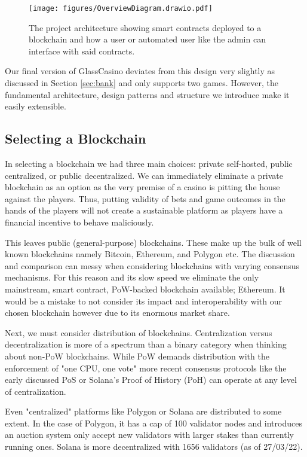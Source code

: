 \documentclass[10pt,journal,compsoc]{IEEEtran}
\begin{document}
\begin{figure}[!h]
    \centering
    \texttt{[image: figures/OverviewDiagram.drawio.pdf]}
    \caption{The project architecture showing smart contracts deployed to a blockchain and how a user or automated user like the admin can interface with said contracts.}
    \label{fig:overallarch}
\end{figure}

Our final version of GlassCasino deviates from this design very slightly as discussed in Section \ref{sec:bank} and only supports two games. However, the fundamental architecture, design patterns and structure we introduce make it easily extensible.

\subsection{Selecting a Blockchain}
In selecting a blockchain we had three main choices: private self-hosted, public centralized, or public decentralized. We can immediately eliminate a private blockchain as an option as the very premise of a casino is pitting the house against the players. Thus, putting validity of bets and game outcomes in the hands of the players will not create a sustainable platform as players have a financial incentive to behave maliciously.

This leaves public (general-purpose) blockchains. These make up the bulk of well known blockchains namely Bitcoin, Ethereum, and Polygon etc. The discussion and comparison can messy when considering blockchains with varying consensus mechanisms. For this reason and its slow speed we eliminate the only mainstream, smart contract, PoW-backed blockchain available; Ethereum. It would be a mistake to not consider its impact and interoperability with our chosen blockchain however due to its enormous market share.

Next, we must consider distribution of blockchains. Centralization versus decentralization is more of a spectrum than a binary category when thinking about non-PoW blockchains. While PoW demands distribution with the enforcement of "one CPU, one vote" more recent consensus protocols like the early discussed PoS or Solana's \cite{yakovenko2018solana} Proof of History (PoH) \cite{proof_of_history:_clock_for_blockchain_solana_medium} can operate at any level of centralization.

Even "centralized" platforms like Polygon or Solana are distributed to some extent. In the case of Polygon, it has a cap of 100 validator nodes and introduces an auction system only accept new validators with larger stakes than currently running ones. Solana is more decentralized with 1656 validators (as of 27/03/22).
\end{document}
